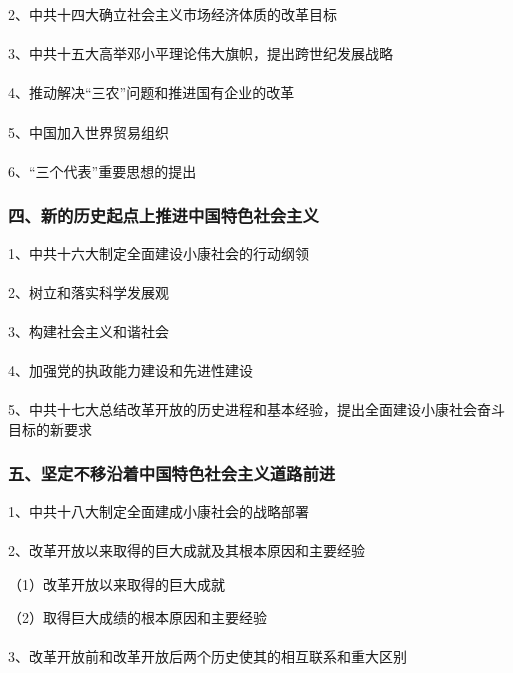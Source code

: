 \documentclass{ctexart}
\begin{document}
2、中共十四大确立社会主义市场经济体质的改革目标
\\\\

3、中共十五大高举邓小平理论伟大旗帜，提出跨世纪发展战略
\\\\

4、推动解决“三农”问题和推进国有企业的改革
\\\\

5、中国加入世界贸易组织
\\\\

6、“三个代表”重要思想的提出

\subsubsection{四、新的历史起点上推进中国特色社会主义}

1、中共十六大制定全面建设小康社会的行动纲领
\\\\

2、树立和落实科学发展观
\\\\

3、构建社会主义和谐社会
\\\\

4、加强党的执政能力建设和先进性建设
\\\\

5、中共十七大总结改革开放的历史进程和基本经验，提出全面建设小康社会奋斗目标的新要求

\subsubsection{五、坚定不移沿着中国特色社会主义道路前进}

1、中共十八大制定全面建成小康社会的战略部署
\\\\

2、改革开放以来取得的巨大成就及其根本原因和主要经验

（1）改革开放以来取得的巨大成就

（2）取得巨大成绩的根本原因和主要经验
\\\\

3、改革开放前和改革开放后两个历史使其的相互联系和重大区别
\\\\
\end{document}
